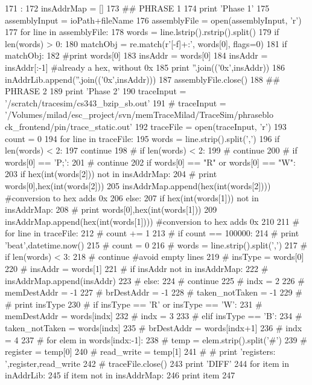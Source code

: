 \begin{DoxyCode}
171            :
172   insAddrMap = []
173   ## PHRASE 1
174   print 'Phase 1'
175   assemblyInput = ioPath+fileName
176   assemblyFile  = open(assemblyInput, 'r')        
177   for line in assemblyFile:
178     words = line.lstrip().rstrip().split()
179     if len(words) > 0:
180       matchObj = re.match(r'[\da-f]+:', words[0], flags=0)
181       if matchObj:
182         #print words[0]
183         insAddr = words[0]
184         insAddr = insAddr[:-1] #already a hex, without 0x
185         print ''.join(('0x',insAddr))
186         inAddrLib.append(''.join(('0x',insAddr)))
187   assemblyFile.close()
188   ## PHRASE 2
189   print 'Phase 2'
190   traceInput = '/scratch/tracesim/cs343_bzip_sb.out'
191   # traceInput = '/Volumes/milad/esc_project/svn/memTraceMilad/TraceSim/phraseblo
      ck_frontend/pin/trace_static.out'
192   traceFile  = open(traceInput, 'r')
193   count = 0
194   for line in traceFile:
195     words = line.strip().split(',')
196     if len(words) < 2:
197       continue
198     # if len(words) < 2:
199     #   continue
200     # if words[0] == 'P;':
201     #   continue
202     if words[0] == "R" or words[0] == "W":
203       if hex(int(words[2])) not in insAddrMap:
204         # print words[0],hex(int(words[2]))
205         insAddrMap.append(hex(int(words[2]))) #conversion to hex adds 0x
206     else:
207       if hex(int(words[1])) not in insAddrMap:
208         # print words[0],hex(int(words[1]))
209         insAddrMap.append(hex(int(words[1]))) #conversion to hex adds 0x
210     
211   # for line in traceFile:
212   #   count += 1
213   #   if count == 100000:
214   #     print 'beat',datetime.now()
215   #     count = 0
216   #   words = line.strip().split(',')
217   #   if len(words) < 3:
218   #     continue #avoid empty lines
219   #   insType = words[0]
220   #   insAddr = words[1]
221   #   if insAddr not in insAddrMap:
222   #     insAddrMap.append(insAddr)
223   #   else:
224   #     continue
225   #   indx = 2
226   #   memDestAddr = -1
227   #   brDestAddr = -1
228   #   taken_notTaken = -1
229   #   # print insType
230   #   if insType == 'R' or insType == 'W':
231   #     memDestAddr = words[indx]
232   #     indx = 3
233   #   elif insType == 'B':
234   #     taken_notTaken = words[indx]
235   #     brDestAddr = words[indx+1]
236   #     indx = 4
237   #   for elem in words[indx:-1]:
238   #     temp = elem.strip().split('#')
239   #     register = temp[0]
240   #     read_write = temp[1]
241   #     # print 'registers: ',register,read_write
242   # traceFile.close()
243   print 'DIFF'
244   for item in inAddrLib:
245     if item not in insAddrMap:
246       print item
247     

\end{DoxyCode}


